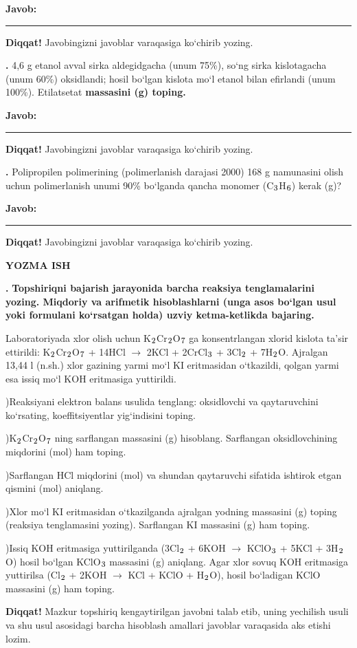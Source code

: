 \documentclass[11pt,a4paper]{article}
\renewcommand{\textsubscript}[1]{\ensuremath{_{\text{\fontsize{8}{8}\selectfont #1}}}}
\newcommand{\qn}[1]{\textbf{\fontsize{11.5}{13}\selectfont #1}}
\newcommand{\qsep}{\par\vspace{1pt}\noindent\rule{0pt}{0.4pt}\par\vspace{5pt}}
\newcommand{\diqqat}[1]{\par\smallskip\noindent\textbf{Diqqat!} #1\par\medskip}
\newcommand{\javob}{\par\smallskip\noindent\textbf{Javob:} \rule[-2pt]{7.5cm}{0.4pt}\par\smallskip\noindent\textbf{Diqqat!} Javobingizni javoblar varaqasiga ko`chirib yozing.\par\medskip}
\begin{document}
\javob\qsep
\noindent\qn{39.} 4,6 g etanol avval sirka aldegidgacha (unum 75\%), so`ng sirka kislotagacha (unum 60\%) oksidlandi; hosil bo`lgan kislota mo`l etanol bilan efirlandi (unum 100\%). Etilatsetat \textbf{massasini (g) toping.}
\javob\qsep
\noindent\qn{40.} Polipropilen polimerining (polimerlanish darajasi 2000) 168 g namunasini olish uchun polimerlanish unumi 90\% bo`lganda qancha monomer (C\textsubscript{3}H\textsubscript{6}) kerak (g)?
\javob\qsep
\par\bigskip\begin{center}\textbf{\fontsize{13}{15}\selectfont YOZMA ISH}\end{center}
\noindent\qn{41.} \textbf{Topshiriqni bajarish jarayonida barcha reaksiya tenglamalarini yozing. Miqdoriy va arifmetik hisoblashlarni (unga asos bo`lgan usul yoki formulani ko`rsatgan holda) uzviy ketma-ketlikda bajaring.}\par\smallskip
Laboratoriyada xlor olish uchun K\textsubscript{2}Cr\textsubscript{2}O\textsubscript{7} ga konsentrlangan xlorid kislota ta'sir ettirildi: K\textsubscript{2}Cr\textsubscript{2}O\textsubscript{7} + 14HCl $\to$ 2KCl + 2CrCl\textsubscript{3} + 3Cl\textsubscript{2} + 7H\textsubscript{2}O. Ajralgan 13,44 l (n.sh.) xlor gazining yarmi mo`l KI eritmasidan o`tkazildi, qolgan yarmi esa issiq mo`l KOH eritmasiga yuttirildi.\par
{})Reaksiyani elektron balans usulida tenglang: oksidlovchi va qaytaruvchini ko`rsating, koeffitsiyentlar yig`indisini toping.\par
{})K\textsubscript{2}Cr\textsubscript{2}O\textsubscript{7} ning sarflangan massasini (g) hisoblang. Sarflangan oksidlovchining miqdorini (mol) ham toping.\par
{})Sarflangan HCl miqdorini (mol) va shundan qaytaruvchi sifatida ishtirok etgan qismini (mol) aniqlang.\par
{})Xlor mo`l KI eritmasidan o`tkazilganda ajralgan yodning massasini (g) toping (reaksiya tenglamasini yozing). Sarflangan KI massasini (g) ham toping.\par
{})Issiq KOH eritmasiga yuttirilganda (3Cl\textsubscript{2} + 6KOH $\to$ KClO\textsubscript{3} + 5KCl + 3H\textsubscript{2}O) hosil bo`lgan KClO\textsubscript{3} massasini (g) aniqlang. Agar xlor sovuq KOH eritmasiga yuttirilsa (Cl\textsubscript{2} + 2KOH $\to$ KCl + KClO + H\textsubscript{2}O), hosil bo`ladigan KClO massasini (g) ham toping.\par
\diqqat{Mazkur topshiriq kengaytirilgan javobni talab etib, uning yechilish usuli va shu usul asosidagi barcha hisoblash amallari javoblar varaqasida aks etishi lozim.}\qsep
\end{document}

